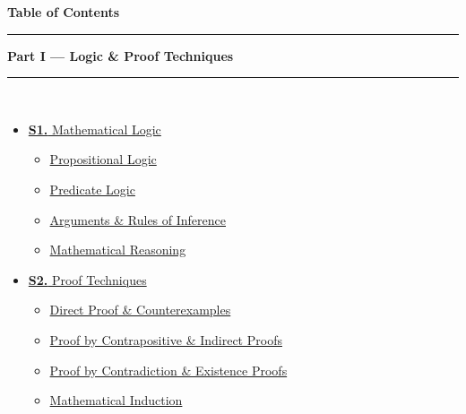 \documentclass[12pt,a3paper]{article}
\begin{document}
\thispagestyle{fancy}
\begin{center}
  {\LARGE\bfseries\textcolor{pblue}{Table of Contents}}\\[6pt]
  \textcolor{pblue}{\rule{0.6\textwidth}{0.8pt}}
\end{center}
\vspace{6pt}

\begin{tcolorbox}[breakable,colback=cA!5,colframe=cA,boxrule=1pt,arc=5pt,
  left=8pt,right=8pt,top=8pt,bottom=8pt,before skip=4pt]
  {\large\bfseries\textcolor{cA}{Part I --- Logic \& Proof Techniques}}\\[5pt]
  \textcolor{cA!40}{\rule{\textwidth}{0.4pt}}\\[3pt]
  \small\begin{itemize}[leftmargin=1.2em,itemsep=1pt,label={\textcolor{cA}{$\triangleright$}}]
    \item \hyperref[sec:S1]{\textbf{S1.} Mathematical Logic}
      \begin{itemize}[leftmargin=1.5em,itemsep=0pt,label={\textcolor{cA}{$\cdot$}}]
        \item \hyperref[sub:s1-proplogic]{Propositional Logic}
        \item \hyperref[sub:s1-predlogic]{Predicate Logic}
        \item \hyperref[sub:s1-proplogic-inference]{Arguments \& Rules of Inference}
        \item \hyperref[sub:s1-reasoning]{Mathematical Reasoning}
      \end{itemize}
    \item \hyperref[sec:S2]{\textbf{S2.} Proof Techniques}
      \begin{itemize}[leftmargin=1.5em,itemsep=0pt,label={\textcolor{cA}{$\cdot$}}]
        \item \hyperref[sub:s2-direct]{Direct Proof \& Counterexamples}
        \item \hyperref[sub:s2-contrapositive]{Proof by Contrapositive \& Indirect Proofs}
        \item \hyperref[sub:s2-contradiction]{Proof by Contradiction \& Existence Proofs}
        \item \hyperref[sub:s2-induction]{Mathematical Induction}
      \end{itemize}
  \end{itemize}
\end{tcolorbox}
\end{document}
